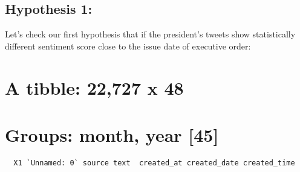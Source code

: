\documentclass[
]{article}
\newenvironment{Shaded}{\begin{snugshade}}{\end{snugshade}}
\newcommand{\CommentTok}[1]{\textcolor[rgb]{0.56,0.35,0.01}{\textit{#1}}}
\newcommand{\DataTypeTok}[1]{\textcolor[rgb]{0.13,0.29,0.53}{#1}}
\newcommand{\DecValTok}[1]{\textcolor[rgb]{0.00,0.00,0.81}{#1}}
\newcommand{\KeywordTok}[1]{\textcolor[rgb]{0.13,0.29,0.53}{\textbf{#1}}}
\newcommand{\NormalTok}[1]{#1}
\newcommand{\OperatorTok}[1]{\textcolor[rgb]{0.81,0.36,0.00}{\textbf{#1}}}
\newcommand{\StringTok}[1]{\textcolor[rgb]{0.31,0.60,0.02}{#1}}
\begin{document}
\begin{Shaded}
\end{Shaded}

\bigskip

\hypertarget{hypothesis-1}{%
\subsection{Hypothesis 1:}\label{hypothesis-1}}

Let's check our first hypothesis that if the president's tweets show
statistically different sentiment score close to the issue date of
executive order:

\hypertarget{a-tibble-22727-x-48}{%
\section{A tibble: 22,727 x 48}\label{a-tibble-22727-x-48}}

\hypertarget{groups-month-year-45}{%
\section{Groups: month, year {[}45{]}}\label{groups-month-year-45}}

\begin{verbatim}
  X1 `Unnamed: 0` source text  created_at created_date created_time
\end{verbatim}
\end{document}
